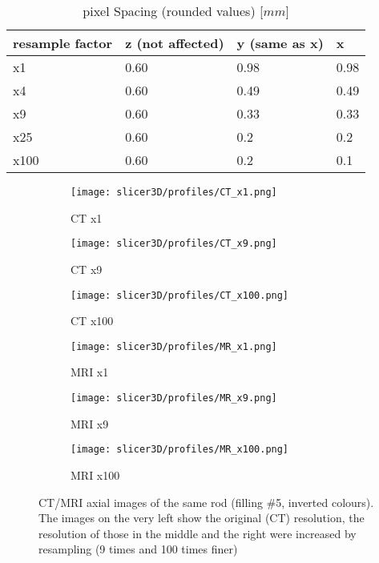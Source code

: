 \begin{table}[!htb]
\centering
\begin{tabular}{l|l|l|l}
resample factor  & z (not affected) &  y (same as x) & x \\
\toprule
x1     & 0.60 & 0.98	& 0.98	\\
x4     & 0.60 & 0.49	& 0.49	\\
x9     & 0.60 & 0.33	& 0.33	\\
x25    & 0.60 & 0.2 	& 0.2	\\
x100   & 0.60 & 0.2 	& 0.1
\end{tabular}
\caption{pixel Spacing (rounded values) [$mm$]}
\label{tab:spacing}
\end{table}


\begin{figure}[!thb]
  \begin{subfigure}[b]{0.32\textwidth}
    \texttt{[image: slicer3D/profiles/CT\_x1.png]}
    \caption{CT x1}
    \label{fig:CT_x1}
  \end{subfigure}
  \hfill
  \begin{subfigure}[b]{0.32\textwidth}
    \texttt{[image: slicer3D/profiles/CT\_x9.png]}
    \caption{CT x9}
    \label{fig:CT_x9}
  \end{subfigure}
    \hfill
  \begin{subfigure}[b]{0.32\textwidth}
    \texttt{[image: slicer3D/profiles/CT\_x100.png]}
    \caption{CT x100}
    \label{fig:CT_x100}
  \end{subfigure}
  \begin{subfigure}[b]{0.32\textwidth}
    \texttt{[image: slicer3D/profiles/MR\_x1.png]}
    \caption{MRI x1}
    \label{fig:MRI_x1}
  \end{subfigure}
  \hfill
  \begin{subfigure}[b]{0.32\textwidth}
    \texttt{[image: slicer3D/profiles/MR\_x9.png]}
    \caption{MRI x9}
    \label{fig:MRI_x9}
  \end{subfigure}
    \hfill
  \begin{subfigure}[b]{0.32\textwidth}
    \texttt{[image: slicer3D/profiles/MR\_x100.png]}
    \caption{MRI x100}
    \label{fig:MRI_x100}
  \end{subfigure}
  \caption{CT/MRI axial images of the same rod (filling \#5, inverted colours). The images on the very left show the original (CT) resolution, the resolution of those in the middle and the right were increased by resampling (9 times and 100 times finer)}
  \label{fig:resample}
\end{figure}
\clearpage

